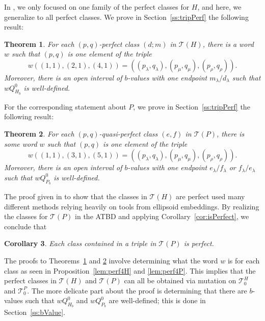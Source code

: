 \documentclass[11pt, reqno]{amsart}
\newtheorem{thm}{Theorem}[subsection]
\newtheorem{cor}[thm]{Corollary}
\theoremstyle{remark}
\numberwithin{equation}{subsection}
\numberwithin{figure}{section}
\theoremstyle{customremark}
\newcommand{\la}{{\lambda}}
\newcommand{\T}{\mathcal{T}}
\begin{document}
In \cite{M1}, we only focused on one family of the perfect classes for $H$, and here, we generalize to all perfect classes. We prove in Section~\ref{ss:tripPerf} the following result: 
\begin{thm} \label{thm:HTrip}
    For each $(p,q)$-perfect class $(d;m)$ in $\mathcal{T}(H)$, there is a word $w$ such that $(p,q)$ is one element of the triple \[w\left((1,1),(2,1),(4,1)\right)=\left((p_\la,q_\la),(p_\mu,q_\mu),(p_\rho,q_\rho)\right).\] Moreover, there is an open interval of \(b\)-values with one endpoint
\(m_\lambda/d_\lambda\) such that \(wQ^0_{H_b}\) is well-defined.
\end{thm} 

For the corresponding statement about $P$, we prove in Section~\ref{ss:tripPerf} the following result: 
\begin{thm} \label{thm:PTrip}
     For each $(p,q)$-quasi-perfect class $(e,f)$ in $\T(P)$, there is some word $w$ such that $(p,q)$ is one element of the triple \[w\left((1,1),(3,1),(5,1)\right)=\left((p_\la,q_\la),(p_\mu,q_\mu),(p_\rho,q_\rho)\right).\] Moreover, there is an open interval of \(b\)-values with one endpoint
\(e_\lambda/f_\lambda\) or \(f_\lambda/e_\lambda\) such that \(wQ^0_{P_b}\) is well-defined.
\end{thm}

The proof given in \cite{MMW} to show that the classes in $\T(H)$ are perfect used many different methods relying heavily on tools from ellipsoid embeddings. By realizing the classes for $\T(P)$ in the ATBD and applying Corollary~\ref{cor:isPerfect}, we conclude that
\begin{cor}
     Each class contained in a triple in $\T(P)$ is perfect. 
\end{cor}



The proofs to Theorems~\ref{thm:HTrip} and \ref{thm:PTrip} involve determining what the word $w$ is for each class as seen in Proposition~\ref{lem:perf4H} and \ref{lem:perf4P}. This implies that the perfect classes in $\T(H)$ and $\T(P)$ can all be obtained via mutation on $\T_0^H$ and $\T_0^P$. The more delicate part about the proof is determining that there are $b$-values such that $wQ_{H_b}^0$ and $wQ_{P_b}^0$ are well-defined; this is done in Section~\ref{ss:bValue}. 
\end{document}
